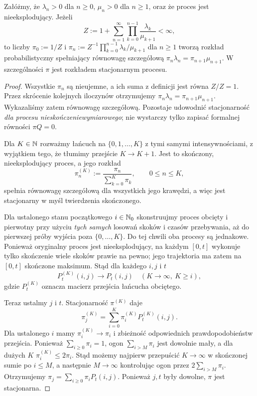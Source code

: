 \begin{stwierdzenie}
Załóżmy, że $\lambda_n>0$ dla $n\ge0$,
$\mu_n>0$ dla $n\ge1$, oraz że proces jest nieeksplodujący.
Jeżeli
\[
Z:=1+\sum_{n=1}^\infty
\prod_{k=0}^{n-1}\frac{\lambda_k}{\mu_{k+1}}<\infty,
\]
to liczby
$\pi_0:=1/Z$ i
$\pi_n:=Z^{-1}\prod_{k=0}^{n-1}\lambda_k/\mu_{k+1}$
dla $n\ge1$ tworzą rozkład probabilistyczny spełniający
równowagę szczegółową
$\pi_n\lambda_n=\pi_{n+1}\mu_{n+1}$.
W szczególności $\pi$ jest rozkładem stacjonarnym procesu.
\end{stwierdzenie}
\begin{proof}
Wszystkie $\pi_n$ są nieujemne, a ich suma z definicji
jest równa $Z/Z=1$. Przez skrócenie kolejnych iloczynów
otrzymujemy $\pi_n\lambda_n=\pi_{n+1}\mu_{n+1}$.
Wykazaliśmy zatem równowagę szczegółową.
Pozostaje udowodnić stacjonarność \emph{dla procesu
nieskończeniewymiarowego}; nie wystarczy tylko zapisać
formalnej równości $\pi Q=0$.

Dla $K\in\mathbb{N}$ rozważmy łańcuch na $\{0,1,\ldots,K\}$
z tymi samymi intensywnościami, z wyjątkiem tego,
że tłumimy przejście $K\to K+1$.
Jest to skończony, nieeksplodujący proces,
a jego rozkład
\[
\pi_n^{(K)}:=\frac{\pi_n}{\sum_{k=0}^K\pi_k},
\qquad 0\le n\le K,
\]
spełnia równowagę szczegółową dla wszystkich jego krawędzi,
a więc jest stacjonarny w myśl twierdzenia skończonego.

Dla ustalonego stanu początkowego $i\in\mathbb{N}_0$ skonstruujmy
proces obcięty i pierwotny przy użyciu \emph{tych samych}
losowań skoków i czasów przebywania, aż do pierwszej próby
wyjścia poza $\{0,\ldots,K\}$. Do tej chwili oba procesy
są jednakowe. Ponieważ oryginalny proces jest nieeksplodujący,
na każdym $[0,t]$ wykonuje tylko skończenie wiele skoków
prawie na pewno; jego trajektoria ma zatem na $[0,t]$
skończone maksimum. Stąd dla każdego $i,j$ i $t$
\[
P_t^{(K)}(i,j)\longrightarrow P_t(i,j)
\quad (K\to\infty,\ K\ge i),
\]
gdzie $P_t^{(K)}$ oznacza macierz przejścia łańcucha
obciętego.

Teraz ustalmy $j$ i $t$. Stacjonarność $\pi^{(K)}$ daje
\[
\pi_j^{(K)}=\sum_{i=0}^K\pi_i^{(K)}P_t^{(K)}(i,j).
\]
Dla ustalonego $i$ mamy $\pi_i^{(K)}\to\pi_i$
i zbieżność odpowiednich prawdopodobieństw przejścia.
Ponieważ $\sum_{i\ge0}\pi_i=1$, ogon
$\sum_{i>M}\pi_i$ jest dowolnie mały, a dla dużych $K$
$\pi_i^{(K)}\le2\pi_i$. Stąd możemy najpierw przepuścić
$K\to\infty$ w skończonej sumie po $i\le M$,
a następnie $M\to\infty$ kontrolując ogon przez
$2\sum_{i>M}\pi_i$. Otrzymujemy
$\pi_j=\sum_{i\ge0}\pi_iP_t(i,j)$.
Ponieważ $j,t$ były dowolne, $\pi$ jest stacjonarna.
\end{proof}


